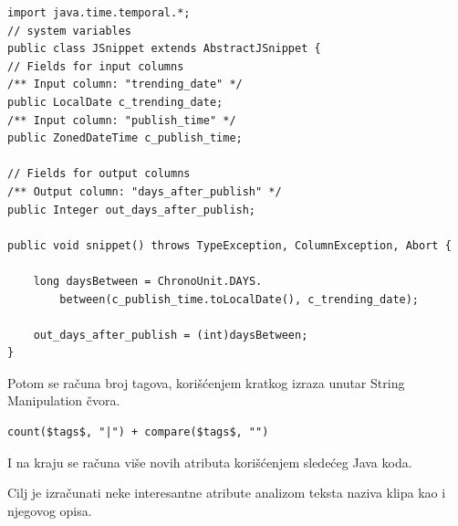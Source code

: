 \documentclass[a4paper]{article}
\theoremstyle{definition}
\begin{document}
\begin{lstlisting}
import java.time.temporal.*;
// system variables
public class JSnippet extends AbstractJSnippet {
// Fields for input columns
/** Input column: "trending_date" */
public LocalDate c_trending_date;
/** Input column: "publish_time" */
public ZonedDateTime c_publish_time;

// Fields for output columns
/** Output column: "days_after_publish" */
public Integer out_days_after_publish;

public void snippet() throws TypeException, ColumnException, Abort {

	long daysBetween = ChronoUnit.DAYS.
		between(c_publish_time.toLocalDate(), c_trending_date);

	out_days_after_publish = (int)daysBetween;	
}
\end{lstlisting}

Potom se računa broj tagova, korišćenjem kratkog izraza unutar String Manipulation čvora.

\begin{verbatim}
count($tags$, "|") + compare($tags$, "")
\end{verbatim}

I na kraju se računa više novih atributa korišćenjem sledećeg Java koda.

Cilj je izračunati neke interesantne atribute analizom teksta naziva klipa kao i njegovog opisa.
\end{document}
